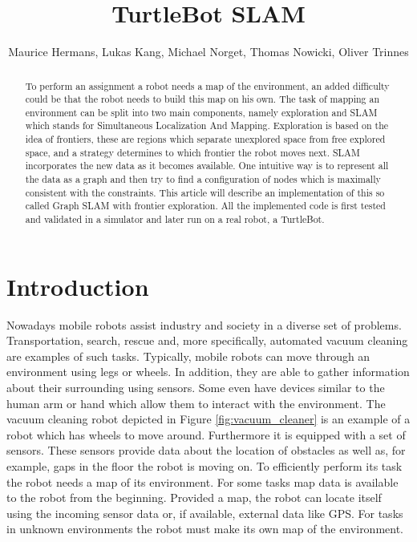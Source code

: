 \documentclass{ba-kecs}
\title{TurtleBot SLAM }
\author{Maurice Hermans, Lukas Kang, Michael Norget, Thomas Nowicki, Oliver Trinnes}
\begin{document}
\maketitle

\begin{abstract}
To perform an assignment a robot needs a map of the environment, an added difficulty could be that the robot needs to build this map on his own. The task of mapping an environment can be split into two main components, namely exploration and SLAM which stands for Simultaneous Localization And Mapping. Exploration is based on the idea of frontiers, these are regions which separate unexplored space from free explored space, and a strategy determines to which frontier the robot moves next. SLAM incorporates the new data as it becomes available. One intuitive way is to represent all the data as a graph and then try to find a configuration of nodes which is maximally consistent with the constraints. This article will describe an implementation of this so called Graph SLAM with frontier exploration. All the implemented code is first tested and validated in a simulator and later run on a real robot, a TurtleBot.
\end{abstract}

\section{Introduction}
\label{sec:intro}
Nowadays mobile robots assist industry and society in a diverse set of problems. Transportation, search, rescue and, more specifically, automated vacuum cleaning are examples of such tasks. Typically, mobile robots can move through an environment using legs or wheels. In addition, they are able to gather information about their surrounding using sensors. Some even have devices similar to the human arm or hand which allow them to interact with the environment. The vacuum cleaning robot depicted in Figure \ref{fig:vacuum_cleaner} is an example of a robot which has wheels to move around. Furthermore it is equipped with a set of sensors. These sensors provide data about the location of obstacles as well as, for example, gaps in the floor the robot is moving on. To efficiently perform its task the robot needs a map of its environment. For some tasks map data is available to the robot from the beginning. Provided a map, the robot can locate itself using the incoming sensor data or, if available, external data like GPS. For tasks in unknown environments the robot must make its own map of the environment.
\end{document}
